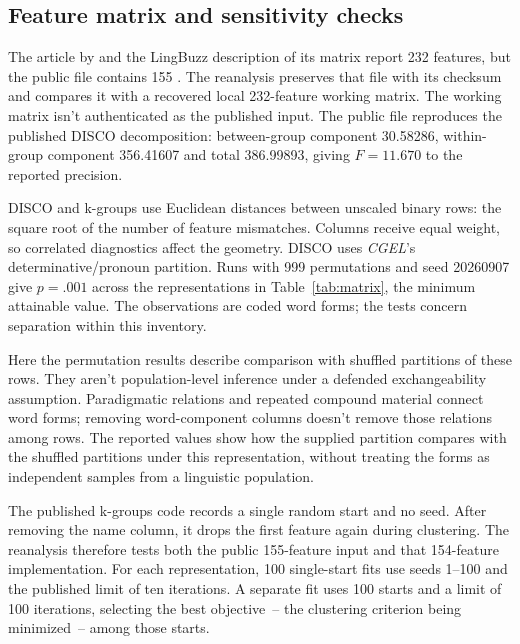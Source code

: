 \documentclass[12pt]{article}
\begin{document}
\subsection{Feature matrix and sensitivity checks}\label{app:matrix}

The article by \textcite{reynolds2021} and the LingBuzz description of its matrix report 232 features, but the public file contains 155 \citep{reynolds2021matrixpublic}. The reanalysis preserves that file with its checksum and compares it with a recovered local 232-feature working matrix. The working matrix isn't authenticated as the published input. The public file reproduces the published DISCO decomposition: between-group component 30.58286, within-group component 356.41607 and total 386.99893, giving $F=11.670$ to the reported precision.

DISCO and k-groups use Euclidean distances between unscaled binary rows: the square root of the number of feature mismatches. Columns receive equal weight, so correlated diagnostics affect the geometry. DISCO uses \textit{CGEL}'s determinative/pronoun partition. Runs with 999 permutations and seed 20260907 give \mbox{$p=.001$} across the representations in Table~\ref{tab:matrix}, the minimum attainable value. The observations are coded word forms; the tests concern separation within this inventory.

Here the permutation results describe comparison with shuffled partitions of these rows. They aren't population-level inference under a defended exchangeability assumption. Paradigmatic relations and repeated compound material connect word forms; removing word-component columns doesn't remove those relations among rows. The reported values show how the supplied partition compares with the shuffled partitions under this representation, without treating the forms as independent samples from a linguistic population.

The published k-groups code records a single random start and no seed. After removing the name column, it drops the first feature again during clustering. The reanalysis therefore tests both the public 155-feature input and that 154-feature implementation. For each representation, 100 single-start fits use seeds 1--100 and the published limit of ten iterations. A separate fit uses 100 starts and a limit of 100 iterations, selecting the best objective~-- the clustering criterion being minimized~-- among those starts.
\end{document}
